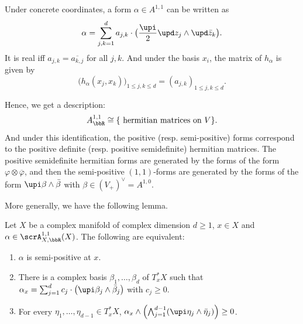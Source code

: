 \begin{example}[label=\labelNFM{eg:hermitian-form-and-11-form-on-a-complex-vs}, status=draft, tag=0000000]
	Under concrete coordinates, a form $\alpha \in A^{1,1}$ can be written as
	\[ \alpha = \sum_{j,k = 1}^{d} a_{j, k} \cdot \bigl(\frac{\upi}{2} \upd z_j \wedge \upd\bar z_k\bigr). \]
	It is real iff $a_{j, k} = \overline{a_{k,j}}$ for all $j,k$.
	And under the basis $x_i$, the matrix of $h_\alpha$ is given by
	\[ \bigl(h_\alpha(x_j,x_k)\bigr)_{1 \leq j,k \leq d} = (a_{j,k})_{1 \leq j,k \leq d}. \]

  Hence, we get a description:
  \[ A^{1,1}_\bbR \cong \{ \text{ hermitian matrices on } V \}. \]
  And under this identification, the positive (resp. semi-positive) forms correspond to the positive definite (resp. positive semidefinite) hermitian matrices.
  The positive semidefinite hermitian forms are generated by the forms of the form $\varphi \otimes \overline{\varphi}$, and then the semi-positive $(1,1)$-forms are generated by the forms of the form $\upi \beta \wedge \bar{\beta}$ with $\beta \in (V_+)^{\vee} = A^{1,0}$.

\end{example}

More generally, we have the following lemma.

\begin{lemma}[label=\labelNFM{lem:characterize-of-positive-11-form}, status=draft, tag=0000000, title={{{\cite[Chapter~III, \S 1.A, (1.7)--(1.9)]{Demailly-2012-ComplexAnalyticDifferential}}}}]
	Let $X$ be a complex manifold of complex dimension $d \geq 1$,
	$x \in X$ and $\alpha \in \scrA_{X,\bbR}^{1,1}(X)$.
	The following are equivalent:
	\begin{enumerate}
		\item $\alpha$ is semi-positive at $x$.
		\item There is a complex basis $\beta_1,\ldots,\beta_d$ of $T_x^{*}X$ such that $\alpha_x = \sum_{j = 1}^d c_j \cdot \bigl(\upi\beta_j \wedge \bar\beta_j\bigr)$ with $c_j \geq 0$.
		\item For every $\eta_1,\ldots,\eta_{d-1} \in T_x^{*}X$, $\alpha_x \wedge \left(\bigwedge_{j = 1}^{d-1}(\upi\eta_j \wedge \bar\eta_j)\right) \geq 0$.
	\end{enumerate}
\end{lemma}

